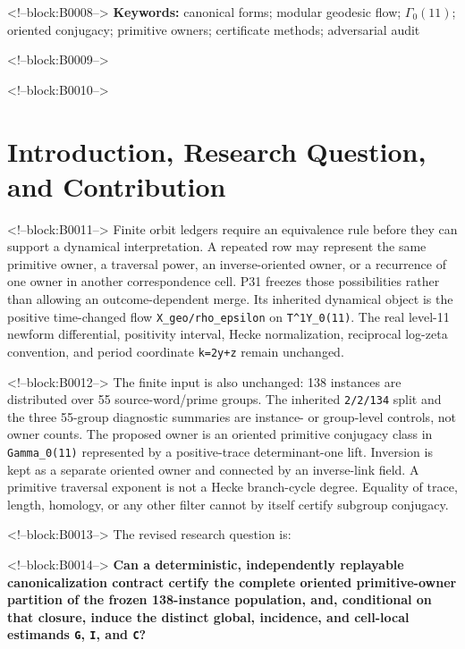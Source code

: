 \documentclass[11pt]{article}
\begin{document}
<!--block:B0008-->
\noindent\textbf{Keywords:} canonical forms; modular geodesic flow;
$\Gamma_0(11)$; oriented conjugacy; primitive owners; certificate methods;
adversarial audit

<!--block:B0009-->
\medskip
{}

<!--block:B0010-->
\hypertarget{1-introduction-research-question-and-contribution}{%
\section{Introduction, Research Question, and
Contribution}\label{1-introduction-research-question-and-contribution}}

<!--block:B0011-->
Finite orbit ledgers require an equivalence rule before they can support
a dynamical interpretation. A repeated row may represent the same
primitive owner, a traversal power, an inverse-oriented owner, or a
recurrence of one owner in another correspondence cell. P31 freezes
those possibilities rather than allowing an outcome-dependent merge. Its
inherited dynamical object is the positive time-changed flow
\texttt{X\_geo/rho\_epsilon} on \texttt{T\^{}1Y\_0(11)}. The real
level-11 newform differential, positivity interval, Hecke normalization,
reciprocal log-zeta convention, and period coordinate \texttt{k=2y+z}
remain unchanged.

<!--block:B0012-->
The finite input is also unchanged: 138 instances are distributed over
55 source-word/prime groups. The inherited \texttt{2/2/134} split and
the three 55-group diagnostic summaries are instance- or group-level
controls, not owner counts. The proposed owner is an oriented primitive
conjugacy class in \texttt{Gamma\_0(11)} represented by a positive-trace
determinant-one lift. Inversion is kept as a separate oriented owner and
connected by an inverse-link field. A primitive traversal exponent is
not a Hecke branch-cycle degree. Equality of trace, length, homology, or
any other filter cannot by itself certify subgroup conjugacy.

<!--block:B0013-->
The revised research question is:

<!--block:B0014-->
\textbf{Can a deterministic, independently replayable canonicalization
contract certify the complete oriented primitive-owner partition of the
frozen 138-instance population, and, conditional on that closure, induce
the distinct global, incidence, and cell-local estimands \texttt{G},
\texttt{I}, and \texttt{C}?}
\end{document}
